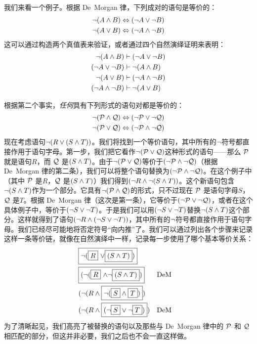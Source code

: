 我们来看一个例子。根据 De~Morgan 律，下列成对的语句是等价的：
\begin{align*}
	\neg (A \wedge B) & \Leftrightarrow (\neg A \vee \neg B)\\
	\neg (A \vee B) & \Leftrightarrow (\neg A \wedge \neg B)
\end{align*}
这可以通过构造两个真值表来验证，或者通过四个自然演绎证明来表明：
\begin{align*}
	\neg (A \wedge B) & \vdash (\neg A \vee \neg B)\\
	(\neg A \vee \neg B) & \vdash \neg (A \wedge B)\\
	\neg (A \vee B) & \vdash (\neg A \wedge \neg B)\\
	(\neg A \wedge \neg B) & \vdash \neg (A \vee B)
\end{align*}

根据第二个事实，\emph{任何}具有下列形式的语句对都是等价的：
\begin{align*}
	\neg (\mathcal{P} \wedge \mathcal{Q}) & \Leftrightarrow (\neg \mathcal{P} \vee \neg \mathcal{Q})\\
	\neg (\mathcal{P} \vee \mathcal{Q}) & \Leftrightarrow (\neg \mathcal{P} \wedge \neg \mathcal{Q})
\end{align*}
现在考虑语句$\neg(R \vee (S \wedge T))$。我们将找到一个等价语句，其中所有的$\neg$符号都直接作用于语句字母。第一步，我们把它看作$\neg(\mathcal{P} \vee \mathcal{Q})$这种形式的语句——那么 $\mathcal{P}$ 就是语句$R$，而 $\mathcal{Q}$ 是$(S \wedge T)$。由于$\neg(\mathcal{P} \vee \mathcal{Q})$等价于$(\neg \mathcal{P} \wedge \neg \mathcal{Q})$（根据 De~Morgan 律的第二条），我们可以将整个语句替换为$(\neg \mathcal{P} \wedge \neg \mathcal{Q})$。在这个例子中（其中 $\mathcal{P}$ 是$R$，$\mathcal{Q}$ 是$(S \wedge T)$）我们得到$(\neg R \wedge \neg (S \wedge T))$。这个新语句包含$\neg (S \wedge T)$作为一个部分。它具有$\neg(\mathcal{P} \wedge \mathcal{Q})$的形式，只不过现在 $\mathcal{P}$ 是语句字母$S$，$\mathcal{Q}$ 是$T$。根据 De~Morgan 律（这次是第一条），它等价于$(\neg\mathcal{P} \vee \neg\mathcal{Q})$，或者在这个具体例子中，等价于$(\neg S \vee \neg T)$。于是我们可以用$(\neg S \vee \neg T)$替换$\neg (S \wedge T)$这个部分。这样就得到了语句$(\neg R \wedge (\neg S \vee \neg T))$，其中所有的$\neg$符号都直接作用于语句字母。我们已经尽可能地将否定符号“向内推”了。我们可以通过列出各个步骤来记录这样一条等价链，就像在自然演绎中一样，记录每一步使用了哪个基本等价关系：
\begin{align*}
	& \fbox{\ensuremath{\neg}(\fbox{$R$} \ensuremath{\vee}\fbox{$(S \wedge T)$})} \\
	& \fbox{(\ensuremath{\neg}(\fbox{$R$} \ensuremath{\wedge}\ensuremath{\neg}\fbox{$(S \wedge T)$})} && \text{DeM}\\
	& (\neg(R \wedge \fbox{$\neg(\fbox{$S$} \wedge \fbox{$T$})$}) \\
	& (\neg(R \wedge \fbox{$(\neg \fbox{$S$} \vee \neg \fbox{$T$})$}) && \text{DeM}
\end{align*}
为了清晰起见，我们高亮了被替换的语句以及那些与 De~Morgan 律中的 $\mathcal{P}$ 和 $\mathcal{Q}$ 相匹配的部分，但这并非必要，我们之后也不会一直这样做。

